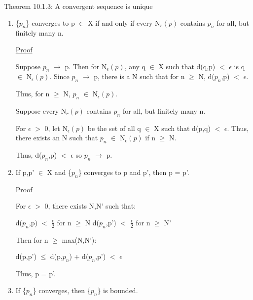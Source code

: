 { \color{red} Theorem 10.1.3: A convergent sequence is unique }

    \begin{enumerate}[label=(\alph*), leftmargin=2cm, itemsep=0.4em]
        \item \{$p_n$\} converges to p $\in$ X if and only if
        every N$_r(p)$ contains $p_n$ for all, but finitely many n.

            { \color{magenta} \underline{Proof} }

                Suppose $p_n$ $\rightarrow$ p.
                Then for N$_{\epsilon}(p)$, any q $\in$ X such that
                d(q,p) $<$ $\epsilon$ is q $\in$ N$_{\epsilon}(p)$.
                Since $p_n$ $\rightarrow$ p, there is a N such that for
                n $\geq$ N, d($p_n$,p) $<$ $\epsilon$.

                Thus, for n $\geq$ N, $p_n$ $\in$ N$_{\epsilon}(p)$.

                Suppose every N$_r(p)$ contains $p_n$ for all, but finitely
                many n.

                For $\epsilon$ $>$ 0, let N$_{\epsilon}(p)$ be the set of
                all q $\in$ X such that d(p,q) $<$ $\epsilon$.
                Thus, there exists an N such that $p_n$ $\in$ N$_{\epsilon}(p)$
                if n $\geq$ N.

                Thus, d($p_n$,p) $<$ $\epsilon$ so $p_n$ $\rightarrow$ p.


        \item If p,p' $\in$ X and \{$p_n$\} converges to p and p', then
        p = p'.

            { \color{magenta} \underline{Proof} }

                For $\epsilon$ $>$ 0, there exists N,N' such that:

                \hspace{1cm}
                d($p_n$,p) $<$ $\frac{\epsilon}{2}$ for n $\geq$ N
                \hspace{1cm}
                d($p_n$,p') $<$ $\frac{\epsilon}{2}$ for n $\geq$ N'

                Then for n $\geq$ max(N,N'):

                \hspace{1cm}
                d(p,p') $\leq$ d(p,$p_n$) + d($p_n$,p') $<$ $\epsilon$

                Thus, p = p'.

        \item If \{$p_n$\} converges, then \{$p_n$\} is bounded.


\end{enumerate}
